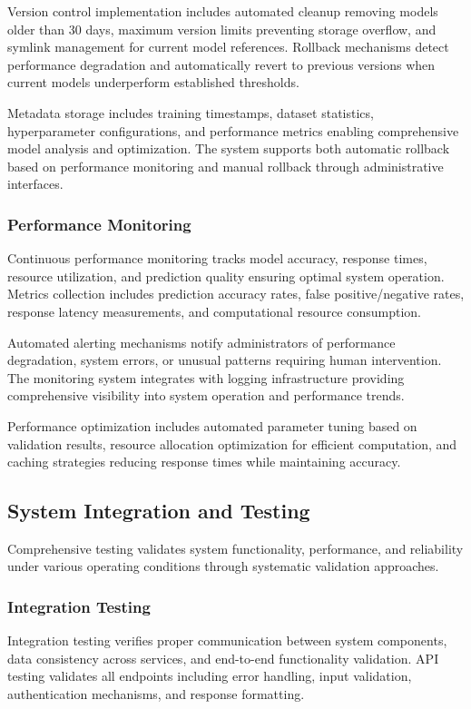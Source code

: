 \documentclass[12pt]{article}
\begin{document}
Version control implementation includes automated cleanup removing models older than 30 days, maximum version limits preventing storage overflow, and symlink management for current model references. Rollback mechanisms detect performance degradation and automatically revert to previous versions when current models underperform established thresholds.

Metadata storage includes training timestamps, dataset statistics, hyperparameter configurations, and performance metrics enabling comprehensive model analysis and optimization. The system supports both automatic rollback based on performance monitoring and manual rollback through administrative interfaces.

\subsubsection{Performance Monitoring}
Continuous performance monitoring tracks model accuracy, response times, resource utilization, and prediction quality ensuring optimal system operation. Metrics collection includes prediction accuracy rates, false positive/negative rates, response latency measurements, and computational resource consumption.

Automated alerting mechanisms notify administrators of performance degradation, system errors, or unusual patterns requiring human intervention. The monitoring system integrates with logging infrastructure providing comprehensive visibility into system operation and performance trends.

Performance optimization includes automated parameter tuning based on validation results, resource allocation optimization for efficient computation, and caching strategies reducing response times while maintaining accuracy.

\subsection{System Integration and Testing}
Comprehensive testing validates system functionality, performance, and reliability under various operating conditions through systematic validation approaches.

\subsubsection{Integration Testing}
Integration testing verifies proper communication between system components, data consistency across services, and end-to-end functionality validation. API testing validates all endpoints including error handling, input validation, authentication mechanisms, and response formatting.
\end{document}
